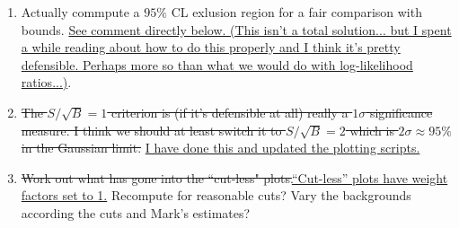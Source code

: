 \documentclass[11pt, a4paper]{article}
\newcommand{\newtext}[2]{\textcolor{#1}{\ul{#2}}}
\begin{document}
\begin{enumerate}





\item Actually commpute a $95\%$ CL exlusion region for a fair comparison with
bounds. \newtext{PB}{See comment directly below. (This isn't a total
solution... but I spent a while reading about how to do this properly and I
think it's pretty defensible. Perhaps more so than what we would do with
log-likelihood ratios...)}.

\item \sout{The $S/\sqrt{B} =1$ criterion is (if it's defensible at all) really a
$1\sigma$ significance measure. I think we should at least switch it to
$S/\sqrt{B} =2$ which is $2\sigma\approx 95\%$ in the Gaussian limit.}
\newtext{PB}{I have done this and updated the plotting scripts.}

\item \sout{Work out what has gone into the ``cut-less"
plots.}\newtext{PB}{``Cut-less'' plots have weight factors set to 1.} Recompute
for reasonable cuts? Vary the backgrounds according the cuts and Mark's
estimates?



\end{enumerate}
\end{document}
